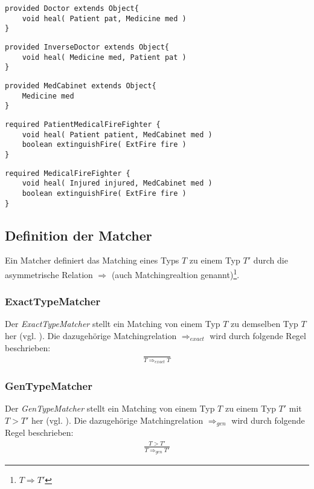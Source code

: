 \begin{lstlisting}[style = dsl]
provided Doctor extends Object{	
	void heal( Patient pat, Medicine med )
}
\end{lstlisting}


\begin{lstlisting}[style = dsl]
provided InverseDoctor extends Object{	
	void heal( Medicine med, Patient pat )
}
\end{lstlisting}

\begin{lstlisting}[style = dsl]
provided MedCabinet extends Object{
	Medicine med
}
\end{lstlisting}

\begin{lstlisting}[style = dsl]
required PatientMedicalFireFighter {
	void heal( Patient patient, MedCabinet med )
	boolean extinguishFire( ExtFire fire )	
}
\end{lstlisting}

\begin{lstlisting}[caption={Bibliothek \emph{ExampLe} von Typen},captionpos=b, style = dsl, label=lst:libEx]
required MedicalFireFighter {
	void heal( Injured injured, MedCabinet med )
	boolean extinguishFire( ExtFire fire )	
}
\end{lstlisting}
\noindent
\subsection{Definition der Matcher}\label{sec_matcher}
Ein Matcher definiert das Matching eines Typs $T$ zu einem Typ $T'$ durch die asymmetrische Relation $\Rightarrow$ (auch Matchingrealtion genannt)\footnote{$T \Rightarrow T'$}.
\subsubsection{ExactTypeMatcher}\label{sec:exacttypematcher}
Der \emph{ExactTypeMatcher} stellt ein Matching von einem Typ $T$ zu demselben Typ $T$ her (vgl. \cite{moormann}). Die dazugehörige Matchingrelation $\Rightarrow_{exact}$ wird durch folgende Regel beschrieben:
\begin{gather*}
\frac{}{T \Rightarrow_{exact} T}
\end{gather*}
\subsubsection{GenTypeMatcher}\label{sec:gentypematcher}
Der \emph{GenTypeMatcher} stellt ein Matching von einem Typ $T$ zu einem Typ $T'$ mit $T > T'$ her (vgl. \cite{moormann}). Die dazugehörige Matchingrelation $\Rightarrow_{gen}$ wird durch folgende Regel beschrieben:
\begin{gather*}
\frac{T > T'}{T \Rightarrow_{gen} T'}
\end{gather*}
